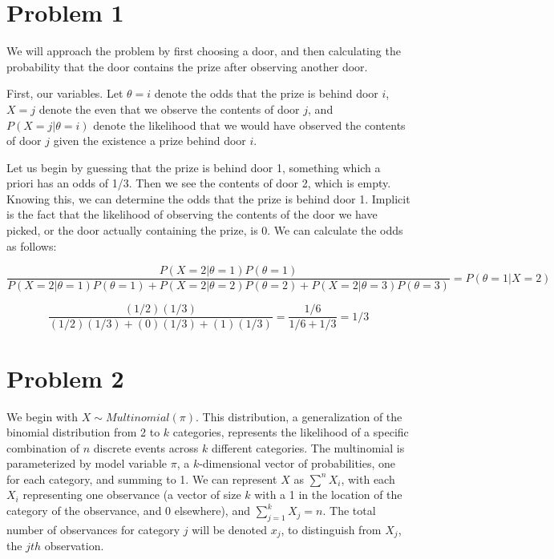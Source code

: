 \documentclass[twoside,11pt]{homework}
\begin{document}
\maketitle

\section*{Problem 1}

We will approach the problem by first choosing a door, and then calculating the probability that the door contains the prize after observing another door.

First, our variables. Let $\theta = i$ denote the odds that the prize is behind door $i$, $X=j$ denote the even that we observe the contents of door $j$, and $P(X=j | \theta=i)$ denote the likelihood that we would have observed the contents of door $j$ given the existence a prize behind door $i$.

Let us begin by guessing that the prize is behind door 1, something which a priori has an odds of 1/3. Then we see the contents of door 2, which is empty. Knowing this, we can determine the odds that the prize is behind door 1. Implicit is the fact that the likelihood of observing the contents of the door we have picked, or the door actually containing the prize, is 0. We can calculate the odds as follows:

\[
\frac{P(X=2 | \theta=1)P(\theta = 1)}{P(X=2 | \theta=1)P(\theta = 1) + P(X=2 | \theta=2)P(\theta = 2) + P(X=2 | \theta=3)P(\theta = 3)} = P(\theta = 1 | X=2)
\]


\[
\frac{(1/2)(1/3)}{(1/2)(1/3) + (0)(1/3) + (1)(1/3)} = \frac{1/6}{1/6 + 1/3} = 1/3
\]

\section*{Problem 2}

We begin with $X \sim Multinomial(\pi)$. This distribution, a generalization of the binomial distribution from 2 to $k$ categories, represents the likelihood of a specific combination of $n$ discrete events across $k$ different categories. The multinomial is parameterized by model variable $\pi$, a $k$-dimensional vector of probabilities, one for each category, and summing to 1. We can represent $X$ as $\sum^n{X_i}$, with each $X_i$ representing one observance (a vector of size $k$ with a 1 in the location of the category of the observance, and 0 elsewhere), and $\sum_{j=1}^k X_j = n$. The total number of observances for category $j$ will be denoted $x_j$, to distinguish from $X_j$, the $jth$ observation.
\end{document}
